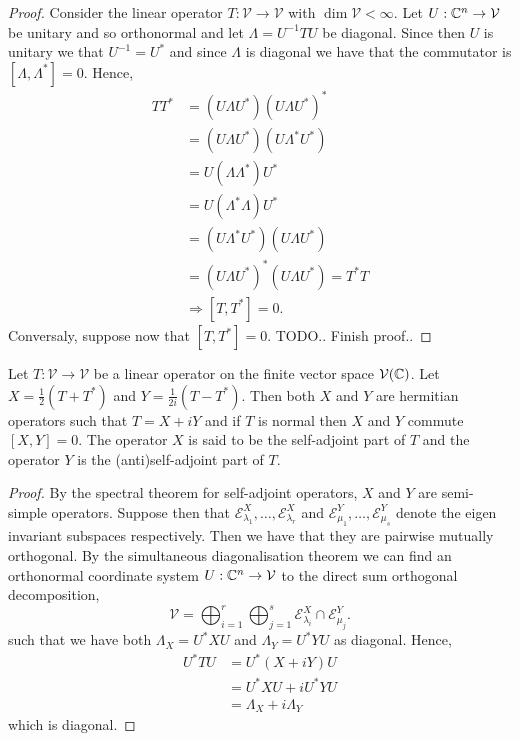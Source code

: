 \begin{proof}
 Consider the linear operator $T : \mathcal{V} \to \mathcal{V}$ with $\dim \mathcal{V} < \infty$.
 Let $U : \mathbb{C}^n \to \mathcal{V}$ be unitary and so orthonormal and let $\Lambda = U^{-1} T U$ be
 diagonal. Since then $U$ is unitary we that $U^{-1}=U^{*}$ and since $\Lambda$ is diagonal we
 have that the commutator is $[\Lambda,\Lambda^{*}]=0$. Hence,
 \begin{align*}
  T T^{*} &= (U \Lambda U^{*}) (U \Lambda U^{*})^{*}
  \\
  &= (U \Lambda U^{*}) (U \Lambda^{*} U^{*})
  \\
  &= U (\Lambda \Lambda^{*}) U^{*}
  \\
  &= U (\Lambda^{*} \Lambda) U^{*}
  \\
  &= (U \Lambda^{*} U^{*}) (U \Lambda U^{*})
  \\
  &= (U \Lambda U^{*})^{*} (U \Lambda U^{*})
  = T^{*} T
  \\
  & \Rightarrow [T,T^{*}] = 0.
 \end{align*}
 Conversaly, suppose now that $[T,T^{*}]=0$. TODO.. Finish proof..
\end{proof}

\begin{lem}
 Let $T: \mathcal{V} \to \mathcal{V}$ be a linear operator on the finite vector space
 $\mathcal{V}(\mathbb{C})$. Let $X= \frac{1}{2}(T+T^{*})$ and $Y=\frac{1}{2 i}(T - T^{*})$.
 Then both $X$ and $Y$ are hermitian operators such that $T=X + i Y$ and if $T$ is normal
 then $X$ and $Y$ commute $[X,Y]=0$. The operator $X$ is said to be the self-adjoint part
 of $T$ and the operator $Y$ is the (anti)self-adjoint part of $T$.
\end{lem}

\begin{proof}
 By the spectral theorem for self-adjoint operators, $X$ and $Y$ are semi-simple operators.
 Suppose then that $\mathcal{E}_{\lambda_1}^{X}, \dots, \mathcal{E}_{\lambda_r}^{X}$
 and $\mathcal{E}_{\mu_1}^{Y}, \dots, \mathcal{E}_{\mu_s}^{Y}$ denote the eigen
 invariant subspaces respectively. Then we have that they are pairwise mutually orthogonal.
 By the simultaneous diagonalisation theorem we can find an orthonormal coordinate system
 $U : \mathbb{C}^n \to \mathcal{V}$ to the direct sum orthogonal decomposition,
 \[
  \mathcal{V} = \bigoplus_{i=1}^{r} \bigoplus_{j=1}^{s}
  \mathcal{E}_{\lambda_i}^{X} \cap \mathcal{E}_{\mu_j}^{Y}.
 \]
 such that we have both $\Lambda_{X} = U^{*} X U$ and $\Lambda_{Y} = U^{*} Y U$ as diagonal.
 Hence,
 \begin{align*}
 U^{*} T U &= U^{*} (X + i Y) U
 \\
 &= U^{*} X U + i U^{*} Y U
 \\
 &= \Lambda_X + i \Lambda_Y
 \end{align*}
 which is diagonal.
\end{proof}

